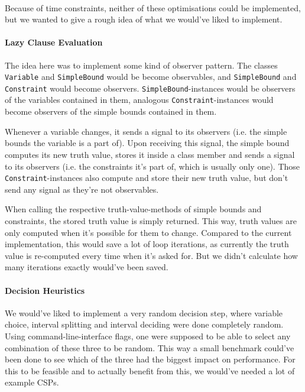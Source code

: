 \paragraph{}
Because of time constraints, neither of these optimisations could be implemented, but we wanted to give a rough idea of what we would've liked to implement.

\paragraph{Lazy Clause Evaluation}
The idea here was to implement some kind of observer pattern.
The classes \texttt{Variable} and \texttt{SimpleBound} would be become observables, and \texttt{SimpleBound} and \texttt{Constraint} would become observers.
\texttt{SimpleBound}-instances would be observers of the variables contained in them, analogous \texttt{Constraint}-instances would become observers of the simple bounds contained in them.

Whenever a variable changes, it sends a signal to its observers (i.e. the simple bounds the variable is a part of).
Upon receiving this signal, the simple bound computes its new truth value, stores it inside a class member and sends a signal to its observers (i.e. the constraints it's part of, which is usually only one).
Those \texttt{Constraint}-instances also compute and store their new truth value, but don't send any signal as they're not observables.

When calling the respective truth-value-methods of simple bounds and constraints, the stored truth value is simply returned.
This way, truth values are only computed when it's possible for them to change.
Compared to the current implementation, this would save a lot of loop iterations, as currently the truth value is re-computed every time when it's asked for.
But we didn't calculate how many iterations exactly would've been saved.


\paragraph{Decision Heuristics}
We would've liked to implement a very random decision step, where variable choice, interval splitting and interval deciding were done completely random.
Using command-line-interface flags, one were supposed to be able to select any combination of these three to be random.
This way a small benchmark could've been done to see which of the three had the biggest impact on performance.
For this to be feasible and to actually benefit from this, we would've needed a lot of example CSPs.
